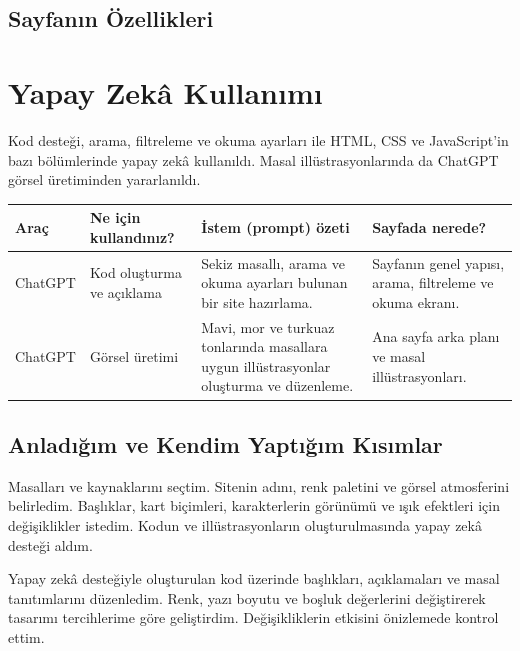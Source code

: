 \documentclass[12pt,a4paper]{article}
\begin{document}
\subsection{Sayfanın Özellikleri}


\section{Yapay Zekâ Kullanımı}
Kod desteği, arama, filtreleme ve okuma ayarları ile HTML, CSS ve JavaScript'in bazı bölümlerinde yapay zekâ kullanıldı. Masal illüstrasyonlarında da ChatGPT görsel üretiminden yararlanıldı.

\begin{longtable}{@{}P{2.4cm}P{3.4cm}P{4.1cm}P{3.4cm}@{}}
\toprule
\textbf{Araç} & \textbf{Ne için kullandınız?} & \textbf{İstem (prompt) özeti} & \textbf{Sayfada nerede?} \\
\midrule
\endhead
ChatGPT & Kod oluşturma ve açıklama & Sekiz masallı, arama ve okuma ayarları bulunan bir site hazırlama. & Sayfanın genel yapısı, arama, filtreleme ve okuma ekranı. \\
ChatGPT & Görsel üretimi & Mavi, mor ve turkuaz tonlarında masallara uygun illüstrasyonlar oluşturma ve düzenleme. & Ana sayfa arka planı ve masal illüstrasyonları. \\
\bottomrule
\end{longtable}

\subsection{Anladığım ve Kendim Yaptığım Kısımlar}
Masalları ve kaynaklarını seçtim. Sitenin adını, renk
paletini ve görsel atmosferini belirledim. Başlıklar,
kart biçimleri, karakterlerin görünümü ve ışık efektleri
için değişiklikler istedim. Kodun ve illüstrasyonların
oluşturulmasında yapay zekâ desteği aldım.

Yapay zekâ desteğiyle oluşturulan kod üzerinde başlıkları,
açıklamaları ve masal tanıtımlarını düzenledim. Renk,
yazı boyutu ve boşluk değerlerini değiştirerek tasarımı
tercihlerime göre geliştirdim. Değişikliklerin etkisini
önizlemede kontrol ettim.

\end{document}
